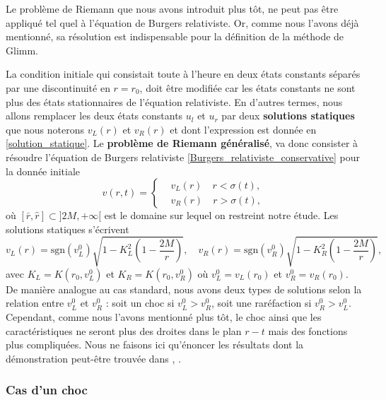 \documentclass[11pt,a4paper]{article}
\begin{document}
Le problème de Riemann que nous avons introduit plus tôt, ne peut pas être appliqué tel quel à l'équation de Burgers relativiste. Or, comme nous l'avons déjà mentionné, sa résolution est indispensable pour la définition de la méthode de Glimm. 

La condition initiale qui consistait toute à l'heure en deux états constants séparés par une discontinuité en $r = r_0$, doit être modifiée car les états constants ne sont plus des états stationnaires de l'équation relativiste. En d'autres termes, nous allons remplacer les deux états constants $u_l$ et $u_r$ par deux \textbf{solutions statiques} que nous noterons $v_L(r)$ et $v_R(r)$ et dont l'expression est donnée en \eqref{solution_statique}. Le \textbf{problème de Riemann généralisé}, va donc consister à résoudre l'équation de Burgers relativiste \eqref{Burgers_relativiste_conservative} pour la donnée initiale
\begin{equation}
	v(r,t) =
	\left\{
		\begin{aligned}
			& v_L(r) \quad r< \sigma(t), \\
			& v_R(r)\quad r> \sigma(t),
		\end{aligned}
	\right.
\end{equation}
où $[\bar{r}, \hat{r}] \subset ]2M,+\infty[$ est le domaine sur lequel on restreint notre étude. Les solutions statiques s'écrivent 
\begin{equation}
	v_L(r) = \text{sgn}(v_L^0)\sqrt{1 - K_L^2\left(1-\frac{2M}{r}\right)}, \quad v_R(r)= \text{sgn}(v_R^0)\sqrt{1 - K_R^2\left(1-\frac{2M}{r}\right)},
\end{equation}
avec $K_L = K(r_0, v_L^0)$ et $K_R = K(r_0, v_R^0)$ où $v_L^0 = v_L(r_0)$ et $v_R^0 = v_R(r_0)$. De manière analogue au cas standard, nous avons deux types de solutions selon la relation entre $v_L^0$ et $v_R^0$ : soit un choc si $v_L^0 > v_R^0$, soit une raréfaction si $v_R^0 > v_L^0$. Cependant, comme nous l'avons mentionné plus tôt, le choc ainsi que les caractéristiques ne seront plus des droites dans le plan $r-t$ mais des fonctions plus compliquées. Nous ne faisons ici qu'énoncer les résultats dont la démonstration peut-être trouvée dans \cite{PLF-SX-one}, \cite{lefloch2016weakly}.

\subsubsection{Cas d'un choc}
\end{document}
